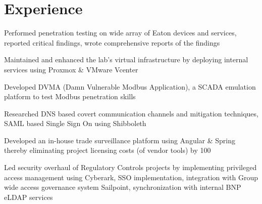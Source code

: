 \documentclass[letterpaper]{deedy-resume} %
\begin{document}
\begin{minipage}[t]{0.66\textwidth} %


\section{Experience}


\vspace{\topsep} %
\begin{tightitemize}
\item  Performed penetration testing on wide array of Eaton devices and services, reported critical findings, wrote comprehensive reports of the findings
\item  Maintained and enhanced the lab's virtual infrastructure by deploying internal services using Proxmox \& VMware Vcenter
\item  Developed DVMA (Damn Vulnerable Modbus Application), a SCADA emulation platform to test Modbus penetration skills
\item  Researched DNS based covert communication channels and mitigation techniques, SAML based Single Sign On using Shibboleth
\end{tightitemize}

\sectionspace %




\begin{tightitemize}
\item Developed an in-house trade surveillance platform using Angular \& Spring thereby eliminating project licensing costs (of vendor tools) by 100%
\item Led security overhaul of Regulatory Controls projects by implementing privileged access management using Cyberark, SSO implementation, integration with Group wide access governance system Sailpoint, synchronization with internal BNP eLDAP services
\end{tightitemize}


\end{minipage}
\end{document}
